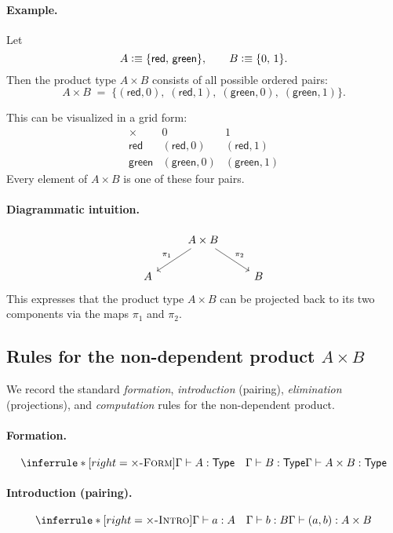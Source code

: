 \documentclass{article}
\newcommand{\Type}{\ensuremath{\mathsf{Type}}}
\newcommand{\defeq}{\vcentcolon\equiv}
\newcommand{\judg}[3]{#1 \vdash #2 : #3}   %
\newcommand{\rulename}[1]{\textsc{#1}}
\begin{document}
\paragraph{Example.}
Let
\[
A \defeq \{\mathsf{red},\, \mathsf{green}\}, \qquad
B \defeq \{0,\, 1\}.
\]
Then the product type \(A \times B\) consists of all possible ordered pairs:
\[
A \times B \;=\;
\{(\mathsf{red},0),\; (\mathsf{red},1),\; (\mathsf{green},0),\; (\mathsf{green},1)\}.
\]

\bigskip
\noindent
This can be visualized in a grid form:
\[
\begin{array}{c|cc}
\times & 0 & 1 \\ \hline
\mathsf{red} & (\mathsf{red},0) & (\mathsf{red},1) \\
\mathsf{green} & (\mathsf{green},0) & (\mathsf{green},1)
\end{array}
\]
Every element of \(A \times B\) is one of these four pairs.

\paragraph{Diagrammatic intuition.}
\[
\begin{tikzcd}
& A \times B \arrow[dl, "\pi_1"'] \arrow[dr, "\pi_2"] & \\
A & & B
\end{tikzcd}
\]
This expresses that the product type \(A \times B\) can be projected back to its two components via the maps \(\pi_1\) and \(\pi_2\).

\subsection*{Rules for the non-dependent product \(A \times B\)}

We record the standard \emph{formation}, \emph{introduction} (pairing),
\emph{elimination} (projections), and \emph{computation} rules for the
non-dependent product.

\paragraph{Formation.}
\[
\inferrule*[right=\rulename{\(\times\)-Form}]{
  \judg{\Gamma}{A}{\Type}
  \quad
  \judg{\Gamma}{B}{\Type}
}{
  \judg{\Gamma}{A \times B}{\Type}
}
\]

\paragraph{Introduction (pairing).}
\[
\inferrule*[right=\rulename{\(\times\)-Intro}]{
  \judg{\Gamma}{a}{A}
  \quad
  \judg{\Gamma}{b}{B}
}{
  \judg{\Gamma}{(a,b)}{A \times B}
}
\]
\end{document}
